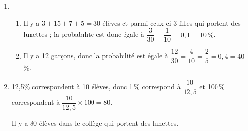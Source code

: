 
\medskip

%
%
%
 
\begin{enumerate}
\item %
	\begin{enumerate}
		\item %
Il y a $3 + 15 + 7 + 5 = 30$ élèves  et parmi ceux-ci 3 filles qui portent des lunettes ; la probabilité est donc égale à $\dfrac{3}{30} = \dfrac{1}{10} = 0,1 = 10\,\%$. 
		\item %
		Il y a 12 garçons, donc la probabilité est égale à $\dfrac{12}{30} = \dfrac{4}{10} = \dfrac{2}{5} = 0,4 = 40$\,\%.
	\end{enumerate} 
\item %
12,5\:\% correspondent à 10 élèves, donc 1\,\% correspond à $\dfrac{10}{12,5}$ et 100\,\% correspondent à $\dfrac{10}{12,5} \times 100 = 80$.

Il y a 80 élèves dans le collège qui portent des lunettes. 
\end{enumerate} 

\vspace{0,5cm}

